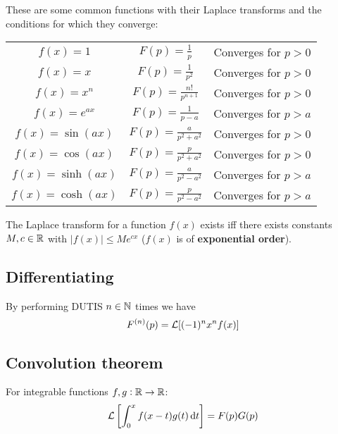 \documentclass[../Year1/Year1.tex]{subfiles}
\begin{document}
\begin{theorem}
    These are some common functions with their Laplace transforms and the conditions for which they converge:
    \renewcommand{\arraystretch}{2}
    \begin{center}
        
        \begin{tabular}{|c|c|c|}
            \hline
            $f(x) = 1$ & $\displaystyle F(p) = \frac{1}{p}$ & Converges for $p>0$ \\
            $f(x) = x$ & $\displaystyle F(p) = \frac{1}{p^2}$ & Converges for $p>0$ \\
            $f(x) = x^n$ & $\displaystyle F(p) = \frac{n!}{p^{n+1}}$ & Converges for $p>0$ \\
            $f(x) = e^{ax}$ & $\displaystyle F(p) = \frac{1}{p-a}$ & Converges for $p>a$ \\
            $f(x) = \sin(ax)$ & $\displaystyle F(p) = \frac{a}{p^2+a^2}$ & Converges for $p>0$ \\
            $f(x) = \cos(ax)$ & $\displaystyle F(p) = \frac{p}{p^2+a^2}$ & Converges for $p>0$ \\
            $f(x) = \sinh(ax)$ & $\displaystyle F(p) = \frac{a}{p^2-a^2}$ & Converges for $p>a$ \\
            \rule[-12pt]{0pt}{0pt} $f(x) = \cosh(ax)$ & $\displaystyle F(p) = \frac{p}{p^2-a^2}$ & Converges for $p>a$ \\ \hline
        \end{tabular}
    \end{center}
    
\end{theorem}

\begin{theorem}
    The Laplace transform for a function $f(x)$ exists iff there exists constants $M,c\in\mathbb{R}$ with $|f(x)|\leq Me^{cx}$ ($f(x)$ is of \textbf{exponential order}).
\end{theorem}

\begingroup\belowdisplayskip=-20pt
\subsection{Differentiating}

\begin{theorem}
    By performing DUTIS $n\in\mathbb{N}$ times we have \[
        F^{(n)}(p) = \mathcal{L}[(-1)^nx^nf(x)]
    \]
\end{theorem}

\subsection{Convolution theorem}

\begin{theorem}
    For integrable functions $f,g:\mathbb{R}\rightarrow\mathbb{R}$:
    \[
        \LLL\left[\intd{0}{x}{f(x-t)g(t)}{t}\right]=F(p)G(p)
    \]
\end{theorem}
\endgroup
\end{document}
